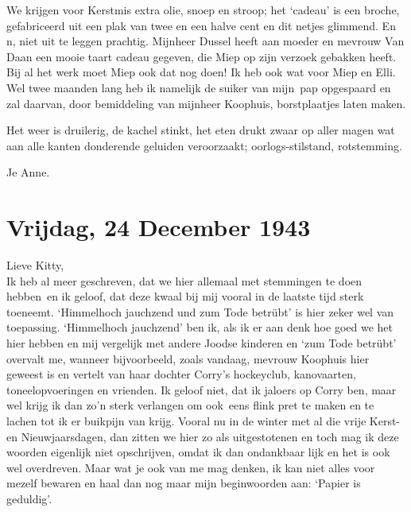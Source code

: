 \documentclass{book}
\begin{document}
We krijgen voor Kerstmis extra olie, snoep en stroop; het `cadeau' is een
broche, gefabriceerd uit een plak van twee en een halve cent en dit netjes
glimmend. En n, niet uit te leggen prachtig. Mijnheer Dussel heeft aan moeder en
mevrouw Van Daan een mooie taart cadeau gegeven, die Miep op zijn verzoek
gebakken heeft. Bij al het werk moet Miep ook dat nog doen! Ik heb ook wat voor
Miep en Elli. Wel twee maanden lang heb ik namelijk de suiker van mijn~pap
opgespaard en zal daarvan, door bemiddeling van mijnheer Koophuis, borstplaatjes
laten maken.

Het weer is druilerig, de kachel stinkt, het eten drukt zwaar op aller magen wat
aan alle kanten donderende geluiden veroorzaakt; oorlogs-stilstand, rotstemming.

Je Anne.

\section*{Vrijdag, 24 December 1943}

Lieve Kitty,\\
Ik heb al meer geschreven, dat we hier allemaal met stemmingen te
doen hebben~en ik geloof, dat deze kwaal bij mij vooral in de laatste tijd sterk
toeneemt. `Himmelhoch jauchzend und zum Tode betrübt' is hier zeker wel van
toepassing. `Himmelhoch jauchzend' ben ik, als ik er aan denk hoe goed we het
hier hebben en mij vergelijk met andere Joodse kinderen en `zum Tode betrübt'
overvalt me, wanneer bijvoorbeeld, zoals vandaag, mevrouw Koophuis hier geweest
is en vertelt van haar dochter Corry's hockeyclub, kanovaarten,
toneelopvoeringen en vrienden. Ik geloof niet, dat ik jaloers op Corry ben, maar
wel krijg ik dan zo'n sterk verlangen om ook~eens flink pret te maken en te
lachen tot ik er buikpijn van krijg. Vooral nu in de winter met al die vrije
Kerst- en Nieuwjaarsdagen, dan zitten we hier zo als uitgestotenen en toch mag
ik deze woorden eigenlijk niet opschrijven, omdat ik dan ondankbaar lijk en het
is ook wel overdreven. Maar wat je ook van me mag denken, ik kan niet alles voor
mezelf bewaren en haal dan nog maar mijn beginwoorden aan: `Papier is geduldig'.
\end{document}
